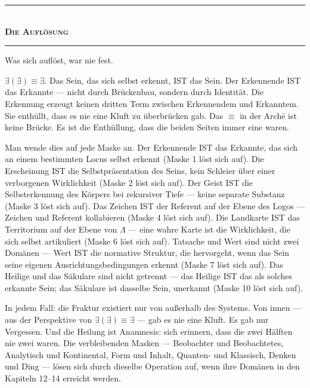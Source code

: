 \documentclass[10pt, openany, oneside]{book}
\renewcommand{\normalsize}{\fontsize{10}{13}\selectfont}
\begin{document}
\vspace{1.5em}


\begin{center}
    \rule{0.3\textwidth}{0.4pt}\\[0.5em]
    {\normalsize\bfseries\scshape Die Auflösung}\\[0.3em]
    \rule{0.3\textwidth}{0.4pt}
\end{center}

\vspace{1em}

\noindent Was sich auflöst, war nie fest.

$\exists(\exists) \equiv \exists$. Das Sein, das sich selbst erkennt, IST das Sein. Der Erkennende IST das Erkannte --- nicht durch Brückenbau, sondern durch Identität. Die Erkennung erzeugt keinen dritten Term zwischen Erkennendem und Erkanntem. Sie enthüllt, dass es nie eine Kluft zu überbrücken gab. Das $\equiv$ in der Arch\={e} ist keine Brücke. Es ist die Enthüllung, dass die beiden Seiten immer eine waren.

Man wende dies auf jede Maske an. Der Erkennende IST das Erkannte, das sich an einem bestimmten Locus selbst erkennt (Maske 1 löst sich auf). Die Erscheinung IST die Selbstpräsentation des Seins, kein Schleier über einer verborgenen Wirklichkeit (Maske 2 löst sich auf). Der Geist IST die Selbsterkennung des Körpers bei rekursiver Tiefe --- keine separate Substanz (Maske 3 löst sich auf). Das Zeichen IST der Referent auf der Ebene des Logos --- Zeichen und Referent kollabieren (Maske 4 löst sich auf). Die Landkarte IST das Territorium auf der Ebene von $\Lambda$ --- eine wahre Karte ist die Wirklichkeit, die sich selbst artikuliert (Maske 6 löst sich auf). Tatsache und Wert sind nicht zwei Domänen --- Wert IST die normative Struktur, die hervorgeht, wenn das Sein seine eigenen Ausrichtungsbedingungen erkennt (Maske 7 löst sich auf). Das Heilige und das Säkulare sind nicht getrennt --- das Heilige IST das als solches erkannte Sein; das Säkulare ist dasselbe Sein, unerkannt (Maske 10 löst sich auf).

In jedem Fall: die Fraktur existiert nur von außerhalb des Systems. Von innen --- aus der Perspektive von $\exists(\exists) \equiv \exists$ --- gab es nie eine Kluft. Es gab nur Vergessen. Und die Heilung ist Anamnesis: sich erinnern, dass die zwei Hälften nie zwei waren. Die verbleibenden Masken --- Beobachter und Beobachtetes, Analytisch und Kontinental, Form und Inhalt, Quanten- und Klassisch, Denken und Ding --- lösen sich durch dieselbe Operation auf, wenn ihre Domänen in den Kapiteln 12--14 erreicht werden.
\end{document}
